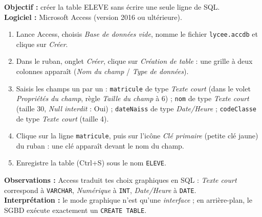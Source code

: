 \documentclass[11pt]{article}
\begin{document}
\begin{experience}
\textbf{Objectif :} créer la table ELEVE sans écrire une seule ligne de SQL.\\
\textbf{Logiciel :} Microsoft Access (version 2016 ou ultérieure).
\begin{enumerate}
\item Lance Access, choisis \emph{Base de données vide}, nomme le fichier \texttt{lycee.accdb} et clique sur \emph{Créer}.
\item Dans le ruban, onglet \emph{Créer}, clique sur \emph{Création de table} : une grille à deux colonnes apparaît (\emph{Nom du champ} / \emph{Type de données}).
\item Saisis les champs un par un : \texttt{matricule} de type \emph{Texte court} (dans le volet \emph{Propriétés du champ}, règle \emph{Taille du champ} à 6) ; \texttt{nom} de type \emph{Texte court} (taille 30, \emph{Null interdit} : Oui) ; \texttt{dateNaiss} de type \emph{Date/Heure} ; \texttt{codeClasse} de type \emph{Texte court} (taille 4).
\item Clique sur la ligne \texttt{matricule}, puis sur l'icône \emph{Clé primaire} (petite clé jaune) du ruban : une clé apparaît devant le nom du champ.
\item Enregistre la table (Ctrl+S) sous le nom \texttt{ELEVE}.
\end{enumerate}
\textbf{Observations :} Access traduit tes choix graphiques en SQL : \emph{Texte court} correspond à \texttt{VARCHAR}, \emph{Numérique} à \texttt{INT}, \emph{Date/Heure} à \texttt{DATE}.\\
\textbf{Interprétation :} le mode graphique n'est qu'une \emph{interface} ; en arrière-plan, le SGBD exécute exactement un \texttt{CREATE TABLE}.
\end{experience}
\end{document}

